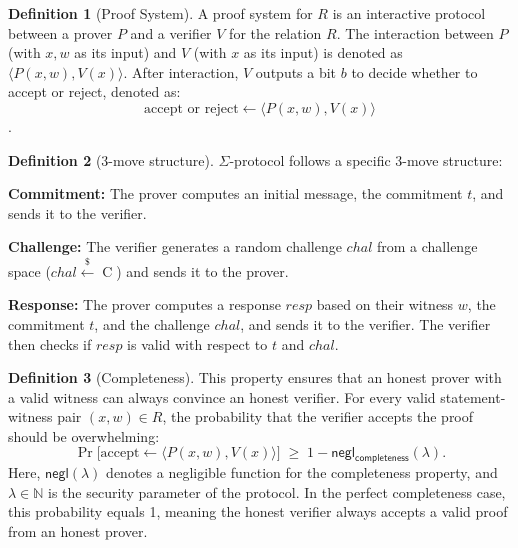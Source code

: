 \documentclass[12pt]{article}
\theoremstyle{definition}
\newtheorem{definition}{Definition}[section]
\begin{document}
\begin{definition}[Proof System]
A proof system for \(R\) is an interactive protocol between a prover \(P\) and a verifier \(V\) for the relation $R$. The interaction between $P$ (with $x,w$ as its input) and $V$ (with $x$ as its input) is denoted as $\langle P(x,w),V(x)\rangle$. After interaction, $V$ outputs a bit $b$ to decide whether to accept or reject, denoted as: 
\[
\text{accept or reject} \leftarrow \langle P(x,w),V(x)\rangle 
\].
\end{definition}

\begin{definition}[3-move structure]
  \(\Sigma\)-protocol follows a specific 3-move structure:
    \item \textbf{Commitment:} The prover computes an initial message, the commitment \(t\), and sends it to the verifier.
    \item \textbf{Challenge:} The verifier generates a random challenge \(chal\) from a challenge space ($chal \xleftarrow{\$} \mathbin{C}$) and sends it to the prover.
    \item \textbf{Response:} The prover computes a response \(resp\) based on their witness $w$, the commitment $t$, and the challenge $chal$, and sends it to the verifier. The verifier then checks if \(resp\) is valid with respect to $t$ and $chal$.
\end{definition}

\begin{definition}[Completeness] This property ensures that an honest prover with a valid witness can always convince an honest verifier. For every valid statement-witness pair \((x,w)\in R\), the probability that the verifier accepts the proof should be overwhelming:
  \[
    \Pr\bigl[\text{accept} \leftarrow \langle P(x,w), V(x)\rangle\bigr]
    \;\ge\; 1 - \mathsf{negl_{completeness}}(\lambda).
  \]
  Here, $\mathsf{negl}(\lambda)$ denotes a negligible function for the completeness property, and $\lambda \in \mathbb{N}$ is the security parameter of the protocol. In the perfect completeness case, this probability equals 1, meaning the honest verifier always accepts a valid proof from an honest prover.
\end{definition}
\end{document}

